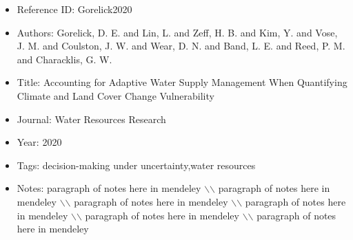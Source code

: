 \documentclass[11pt]{article}
\begin{document}
\noindent\citep{Gorelick2020} 
\begin{itemize} 
\item{Reference ID:  Gorelick2020} 

\item{Authors:  Gorelick, D. E. and Lin, L. and Zeff, H. B. and Kim, Y. and Vose, J. M. and Coulston, J. W. and Wear, D. N. and Band, L. E. and Reed, P. M. and Characklis, G. W.} 

\item{Title:  Accounting for Adaptive Water Supply Management When Quantifying Climate and Land Cover Change Vulnerability} 

\item{Journal:  Water Resources Research} 

\item{Year:  2020} 

\item{Tags:  decision-making under uncertainty,water resources} 

\item{Notes:  paragraph of notes here in mendeley $\backslash$$\backslash$ paragraph of notes here in mendeley $\backslash$$\backslash$ paragraph of notes here in mendeley $\backslash$$\backslash$ paragraph of notes here in mendeley $\backslash$$\backslash$ paragraph of notes here in mendeley $\backslash$$\backslash$ paragraph of notes here in mendeley} 

\end{itemize}\medskip
\end{document}
